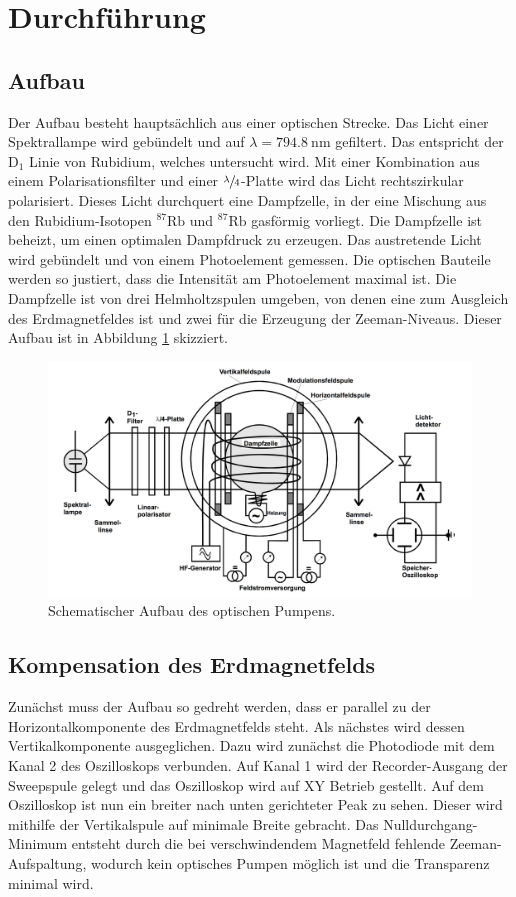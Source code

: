 \section{Durchführung}
\subsection{Aufbau}
\label{sec:Durchführung}
Der Aufbau besteht hauptsächlich aus einer optischen Strecke. Das Licht einer Spektrallampe wird gebündelt und auf $\lambda = \SI{794,8}{\nano \meter}$
gefiltert. Das entspricht der $\text{D}_1$ Linie von Rubidium, welches untersucht wird. Mit einer Kombination aus einem Polarisationsfilter und einer
$\sfrac{\lambda}{4}$-Platte wird das Licht rechtszirkular polarisiert. Dieses Licht durchquert eine Dampfzelle, in der eine Mischung aus den Rubidium-Isotopen ${}^{87}\text{Rb}$
und ${}^{87}\text{Rb}$ gasförmig vorliegt. Die Dampfzelle ist beheizt, um einen optimalen Dampfdruck zu erzeugen. Das austretende Licht wird gebündelt
und von einem Photoelement gemessen. Die optischen Bauteile werden so justiert, dass die Intensität am Photoelement maximal ist. Die Dampfzelle ist von drei Helmholtzspulen umgeben, von denen eine zum Ausgleich des Erdmagnetfeldes ist und zwei für
die Erzeugung der Zeeman-Niveaus. Dieser Aufbau ist in Abbildung \ref{fig:aufbaucom} skizziert.


\begin{figure}
	\centering
	\includegraphics[width=0.8\linewidth]{img/aufbaucom.jpg}
	\caption{Schematischer Aufbau des optischen Pumpens.\cite{V21}}
	\label{fig:aufbaucom}
\end{figure}

\subsection{Kompensation des Erdmagnetfelds}
Zunächst muss der Aufbau so gedreht werden, dass er parallel zu der Horizontalkomponente des Erdmagnetfelds steht. Als nächstes wird dessen Vertikalkomponente ausgeglichen. Dazu wird zunächst die Photodiode mit dem Kanal 2 des Oszilloskops verbunden. Auf Kanal 1 wird der Recorder-Ausgang der Sweepspule gelegt und das Oszilloskop wird auf XY Betrieb gestellt. Auf dem Oszilloskop ist nun ein breiter nach unten gerichteter Peak zu sehen. Dieser wird mithilfe der Vertikalspule auf minimale Breite gebracht. Das Nulldurchgang-Minimum entsteht durch die bei verschwindendem Magnetfeld fehlende Zeeman-Aufspaltung, wodurch kein optisches Pumpen möglich ist und die Transparenz minimal wird.

